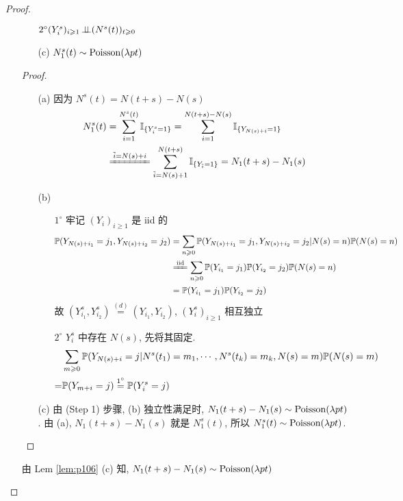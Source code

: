 \begin{proof}
\begin{enumerate}
\begin{lemma}
\begin{enumerate}
            $2^{\circ} (Y_i^s)_{i\geqslant 1}\operatorname{\perp\!\!\!\perp} (N^s(t))_{t\geqslant 0}$
            \item[(c)] $N_1^s(t)\sim \operatorname{Poisson}(\lambda pt)$
        \end{enumerate}
    \end{lemma}
    \begin{proof}
        \begin{enumerate}
        \item[(a)] 因为 $N^s(t)=N(t+s)-N(s)$
        \[
        \begin{aligned}
N_1^s(t)&=\sum_{i=1}^{N^s(t)}\II_{\{Y_i^s=1\}}=\sum_{i=1}^{N(t+s)-N(s)}\II_{\{Y_{N(s)+i}=1\}}\\
&\xlongequal{\tilde{i}=N(s)+i}\sum_{\tilde{i}=N(s)+1}^{N(t+s)}\II_{\{Y_{\tilde{i}}=1\}}=N_1(t+s)-N_1(s)
\end{aligned}
        \]
        \item[(b)] 
        		 \begin{enumerate}
            \item[$1^{\circ}$] 牢记 $(Y_i)_{i\geq 1}$ 是 iid 的
            \[
            \begin{aligned}
                \PP(Y_{N(s)+i_1}=j_1, Y_{N(s)+i_2}=j_2)&= \sum_{n\geq 0}\PP(Y_{N(s)+i_1}=j_1,Y_{N(s)+i_2}=j_2|N(s)=n)\PP(N(s)=n)\\
                &\xlongequal{\text{iid}}\sum_{n\geq 0}\PP(Y_{i_1}=j_1)\PP(Y_{i_2}=j_2)\PP(N(s)=n)\\
                &=\PP(Y_{i_1}=j_1)\PP(Y_{i_2}=j_2)
            \end{aligned}
            \]
            故 $(Y_{i_1}^s,Y_{i_2}^s)\overset{(d)}{=}(Y_{i_1},Y_{i_2})$, $(Y_i^s)_{i\geq 1}$ 相互独立
            \item[$2^{\circ}$] $Y^s_i$ 中存在 $N(s)$, 先将其固定. 
            \[
            \begin{aligned}
&\sum_{m\geqslant 0}\mathbb{P}(Y_{N(s)+i}=j|N^s(t_1)=m_1,\cdots,N^s(t_k)=m_k,N(s)=m)\mathbb{P}(N(s)=m)\\
=&\mathbb{P}(Y_{m+i}=j)\overset{1^{\circ}}{=}\mathbb{P}(Y_i^s=j)
\end{aligned}
            \]
            \end{enumerate}
				\item[(c)] 由 (Step 1) 步骤, (b) 独立性满足时, $N_1(t+s)-N_1(s)\sim \operatorname{Poisson}(\lambda pt)$. 由 (a), $N_1(t+s)-N_1(s)$ 就是 $N_1^s(t)$, 所以 $N_1^s(t)\sim \operatorname{Poisson}(\lambda pt)$.
        \end{enumerate}
    \end{proof}
    由 Lem \ref{lem:p106} (c) 知, $N_1(t+s)-N_1(s)\sim \operatorname{Poisson}(\lambda pt)$
    

\end{enumerate}
\end{proof}
